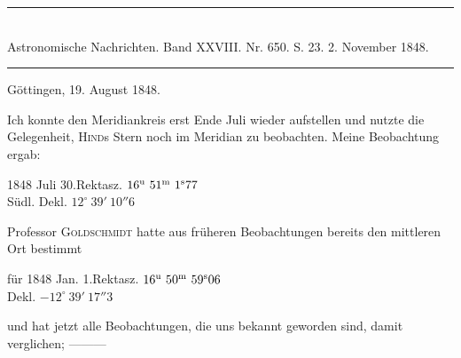 \clearpage
{}
\begin{center}
\rule{0.55\linewidth}{0.4pt}\\[2pt]
Astronomische Nachrichten. Band XXVIII. Nr. 650. S. 23. 2. November 1848.\\[2pt]
\rule{0.55\linewidth}{0.4pt}
\end{center}
\begin{flushright}Göttingen, 19. August 1848.\end{flushright}

Ich konnte den Meridiankreis erst Ende Juli wieder aufstellen und nutzte die Gelegenheit, \textsc{Hind}s Stern noch im Meridian zu beobachten. Meine Beobachtung ergab:

\begin{center}
1848 Juli 30.\quad Rektasz. $16^{\rm u}\ 51^{\rm m}\ 1^{\rm s}77$\\
Südl. Dekl. $12^\circ\ 39'\ 10''6$
\end{center}

Professor \textsc{Goldschmidt} hatte aus früheren Beobachtungen bereits den mittleren Ort bestimmt

\begin{center}
für 1848 Jan. 1.\quad Rektasz. $16^{\rm u}\ 50^{\rm m}\ 59^{\rm s}06$\\
Dekl. $-12^\circ\ 39'\ 17''3$
\end{center}

und hat jetzt alle Beobachtungen, die uns bekannt geworden sind, damit verglichen; \mbox{---\quad---\quad---}

